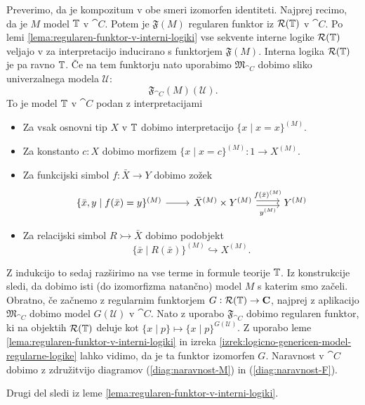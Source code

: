 \documentclass[../kategoricna_logika.tex]{subfiles}
\begin{document}
\begin{dokaz}
  Preverimo, da je kompozitum v obe smeri izomorfen identiteti.
  Najprej recimo, da je $M$ model $\mathbb{T}$ v $\cat{C}$. Potem je $\mathfrak{F}(M)$ regularen
  funktor iz $\mathcal{R}(\mathbb{T})$ v $\cat{C}$. Po lemi \ref{lema:regularen-funktor-v-interni-logiki}
  vse sekvente interne logike $\mathcal{R}(\mathbb{T})$ veljajo v za interpretacijo inducirano
  s funktorjem $\mathfrak{F}(M)$. Interna logika $\mathcal{R}(\mathbb{T})$ je pa ravno $\mathbb{T}$.
  Če na tem funktorju nato uporabimo $\mathfrak{M}_{\cat{C}}$ dobimo sliko
  univerzalnega modela $\mathcal{U}$:
  \[ \mathfrak{F}_{\cat{C}}(M)(\mathcal{U}).\]
  To je model $\mathbb{T}$ v $\cat{C}$ podan z interpretacijami
  \begin{itemize}
  \item Za vsak osnovni tip $X$ v $\mathbb{T}$ dobimo interpretacijo $\{ x \mid x = x\}^{(M)}$.
  \item Za konstanto $c : X$ dobimo morfizem $\{ x \mid x = c\}^{(M)} : 1 \to X^{(M)}$.
  \item Za funkcijski simbol $f : \bar{X} \to Y$ dobimo zožek
    \begin{equation*}
      \begin{tikzcd}
        \{ \bar{x},y \mid f(\bar{x}) = y\}^{(M)} \ar[r] & \bar{X}^{(M)} \times Y^{(M)}
        \ar[r, shift left, "f(\bar{x})^{(M)}"] \ar[r, shift right, "y^{(M)}"'] & Y^{(M)}
      \end{tikzcd}
    \end{equation*}
  \item Za relacijski simbol $R \rightarrowtail \bar{X}$ dobimo podobjekt
    \[ \{ \bar{x} \mid R(\bar{x})\}^{(M)} \hookrightarrow X^{(M)}.\]
  \end{itemize}
  Z indukcijo to sedaj razširimo na vse terme in formule teorije $\mathbb{T}$.
  Iz konstrukcije sledi, da dobimo isti (do izomorfizma natančno) model $M$ s katerim
  smo začeli.
  Obratno, če začnemo z regularnim funktorjem $G : \mathcal{R}(\mathbb{T}) \to {\operatorname{\mathbf{C}}}$, najprej z
  aplikacijo $\mathfrak{M}_{\cat{C}}$ dobimo model $G(\mathcal{U})$ v $\cat{C}$. Nato z uporabo
  $\mathfrak{F}_{\cat{C}}$ dobimo regularen funktor, ki na objektih $\mathcal{R}(\mathbb{T})$ deluje
  kot $\{ x \mid p\} \mapsto \{ x \mid p\}^{G(\mathcal{U})}$. Z uporabo leme
  \ref{lema:regularen-funktor-v-interni-logiki} in izreka
  \ref{izrek:logicno-genericen-model-regularne-logike} lahko vidimo, da je ta funktor
  izomorfen $G$. Naravnost v $\cat{C}$ dobimo z združitvijo diagramov (\ref{diag:naravnost-M})
  in (\ref{diag:naravnost-F}).

  Drugi del sledi iz leme \ref{lema:regularen-funktor-v-interni-logiki}.
\end{dokaz}
\end{document}
